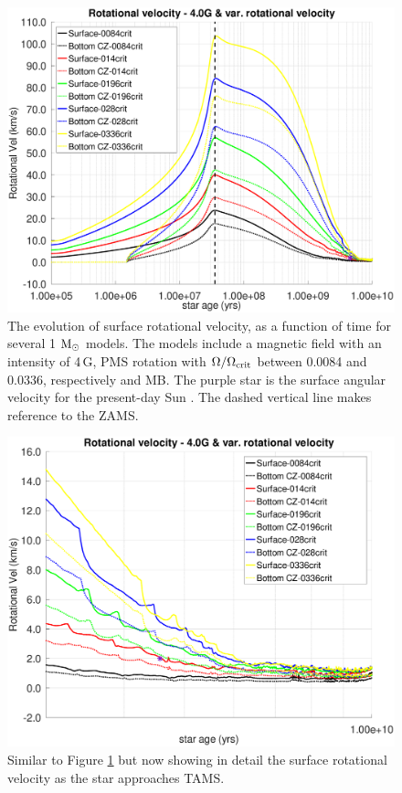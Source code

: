 \documentclass[fleqn,usenatbib]{mnras}
\begin{document}
\begin{figure}
	\includegraphics[trim = 10mm 10mm 15mm 10mm, clip,width=\columnwidth]{figures/rot_vel_var_vel_4_0g.eps}
    \caption{The evolution of surface rotational velocity, as a function of time for several 1 $\mathrm{M}_\odot$ models. The models include a magnetic field with an intensity of 4\,G, PMS rotation with $\Omega / \Omega_{\mathrm{crit}}$ between 0.0084 and 0.0336, respectively and MB. The purple star is the surface angular velocity for the present-day Sun \citep{Gill2012}. The dashed vertical line makes reference to the ZAMS.}
    \label{fig:rot_vel_4g}
\end{figure}

\begin{figure}
	\includegraphics[trim = 10mm 10mm 15mm 10mm, clip,width=\columnwidth]{figures/rot_vel_var_vel_4_0g_z1.eps}
    \caption{Similar to Figure \ref{fig:rot_vel_4g} but now showing in detail the surface rotational velocity as the star approaches TAMS.}
    \label{fig:rot_vel_4g_z1}
\end{figure}
\end{document}
